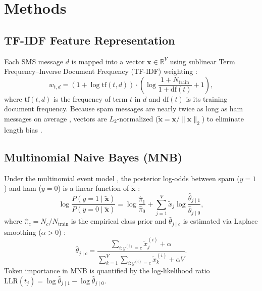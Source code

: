 \documentclass[conference]{IEEEtran}
\begin{document}
\section{Methods}

\subsection{TF-IDF Feature Representation}
Each SMS message $d$ is mapped into a vector $\mathbf{x} \in \mathbb{R}^{V}$
using sublinear Term Frequency--Inverse Document Frequency (TF-IDF) weighting
\cite{zhang2011comparative}:
\begin{equation}
    w_{t,d} = \left(1 + \log \text{tf}(t, d)\right) \cdot
    \left(\log \frac{1 + N_{\text{train}}}{1 + \text{df}(t)} + 1\right),
\end{equation}
where $\text{tf}(t,d)$ is the frequency of term $t$ in $d$ and $\text{df}(t)$
is its training document frequency. Because spam messages are nearly twice as
long as ham messages on average \cite{10.1145/2034691.2034742}, vectors are
$L_2$-normalized ($\tilde{\mathbf{x}} = \mathbf{x} / \|\mathbf{x}\|_2$) to
eliminate length bias \cite{metsis2006spam}.

\subsection{Multinomial Naive Bayes (MNB)}
Under the multinomial event model \cite{mccallum1998comparison,
metsis2006spam}, the posterior log-odds between spam ($y=1$) and ham ($y=0$)
is a linear function of $\tilde{\mathbf{x}}$ \cite{NIPS2001_7b7a53e2}:
\begin{equation}
    \log \frac{P(y=1 \mid \tilde{\mathbf{x}})}{P(y=0 \mid \tilde{\mathbf{x}})}
    = \log \frac{\hat{\pi}_1}{\hat{\pi}_0} +
    \sum_{j=1}^{V} \tilde{x}_j \log \frac{\hat{\theta}_{j \mid 1}}{\hat{\theta}_{j \mid 0}},
\end{equation}
where $\hat{\pi}_c = N_c / N_{\text{train}}$ is the empirical class prior and
$\hat{\theta}_{j \mid c}$ is estimated via Laplace smoothing ($\alpha > 0$)
\cite{mccallum1998comparison, metsis2006spam}:
\begin{equation}
    \hat{\theta}_{j \mid c} =
    \frac{\sum_{i: y^{(i)}=c} \tilde{x}_j^{(i)} + \alpha}
    {\sum_{k=1}^{V} \sum_{i: y^{(i)}=c} \tilde{x}_k^{(i)} + \alpha V}.
\end{equation}
Token importance in MNB is quantified by the log-likelihood ratio
$\text{LLR}(t_j) = \log \hat{\theta}_{j \mid 1} - \log \hat{\theta}_{j \mid 0}$.
\end{document}
